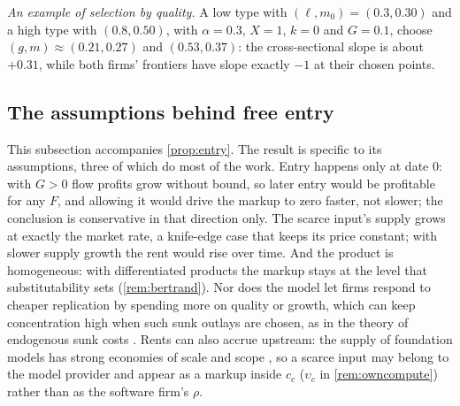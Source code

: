 \emph{An example of selection by quality.} A low type with $(\ell,m_0)=(0.3,0.30)$ and a high type with $(0.8,0.50)$, with $\alpha=0.3$, $X=1$, $k=0$ and $G=0.1$, choose $(g,m)\approx(0.21,0.27)$ and $(0.53,0.37)$: the cross-sectional slope is about $+0.31$, while both firms' frontiers have slope exactly $-1$ at their chosen points.

\subsection{The assumptions behind free entry}\label{supp:model-entry}
This subsection accompanies \autoref{prop:entry}. The result is specific to its assumptions, three of which do most of the work. Entry happens only at date 0: with $G>0$ flow profits grow without bound, so later entry would be profitable for any $F$, and allowing it would drive the markup to zero faster, not slower; the conclusion is conservative in that direction only. The scarce input's supply grows at exactly the market rate, a knife-edge case that keeps its price constant; with slower supply growth the rent would rise over time. And the product is homogeneous: with differentiated products the markup stays at the level that substitutability sets (\autoref{rem:bertrand}). Nor does the model let firms respond to cheaper replication by spending more on quality or growth, which can keep concentration high when such sunk outlays are chosen, as in the theory of endogenous sunk costs \citep{sutton1991sunk}. Rents can also accrue upstream: the supply of foundation models has strong economies of scale and scope \citep{korinek2025concentrating}, so a scarce input may belong to the model provider and appear as a markup inside $c_c$ ($\upsilon_c$ in \autoref{rem:owncompute}) rather than as the software firm's $\rho$.

